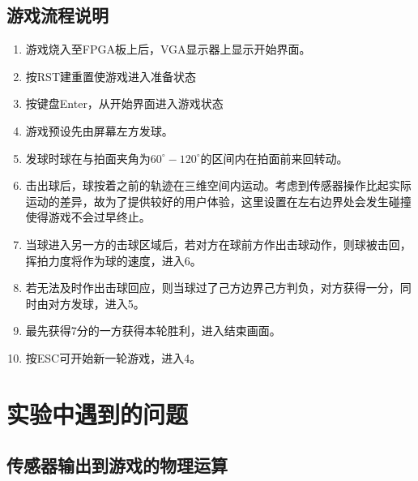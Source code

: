 \documentclass[UTF8]{article}
\begin{document}
\subsection{游戏流程说明}
\begin{enumerate}
\item 游戏烧入至FPGA板上后，VGA显示器上显示开始界面。
\item 按RST建重置使游戏进入准备状态
\item 按键盘Enter，从开始界面进入游戏状态
\item 游戏预设先由屏幕左方发球。
\item 发球时球在与拍面夹角为$60^\circ-120^\circ$的区间内在拍面前来回转动。
\item 击出球后，球按着之前的轨迹在三维空间内运动。考虑到传感器操作比起实际运动的差异，故为了提供较好的用户体验，这里设置在左右边界处会发生碰撞使得游戏不会过早终止。
\item 当球进入另一方的击球区域后，若对方在球前方作出击球动作，则球被击回，挥拍力度将作为球的速度，进入6。
\item 若无法及时作出击球回应，则当球过了己方边界己方判负，对方获得一分，同时由对方发球，进入5。
\item 最先获得7分的一方获得本轮胜利，进入结束画面。
\item 按ESC可开始新一轮游戏，进入4。
\end{enumerate}
\section{实验中遇到的问题}
\subsection{传感器输出到游戏的物理运算}
\end{document}
